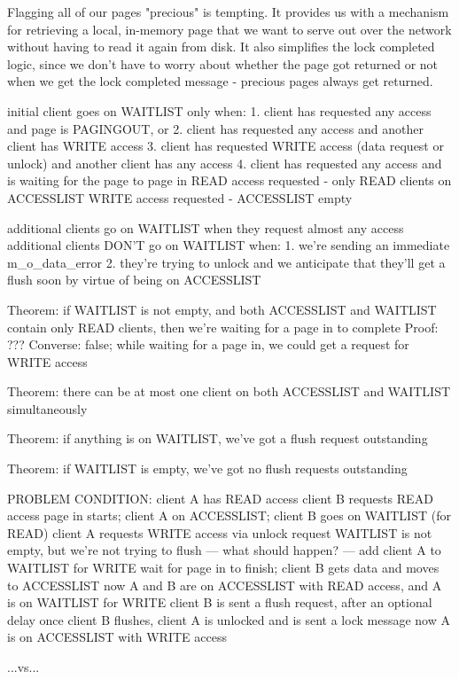 \documentclass{article}
\begin{document}
Flagging all of our pages "precious" is tempting.  It provides us with a mechanism
for retrieving a local, in-memory page that we want to serve out over the network
without having to read it again from disk.  It also simplifies the lock completed
logic, since we don't have to worry about whether the page got returned or not
when we get the lock completed message - precious pages always get returned.


initial client goes on WAITLIST only when:
1. client has requested any access and page is PAGINGOUT, or
2. client has requested any access and another client has WRITE access
3. client has requested WRITE access (data request or unlock) and another client has any access
4. client has requested any access and is waiting for the page to page in
     READ access requested - only READ clients on ACCESSLIST
     WRITE access requested - ACCESSLIST empty

additional clients go on WAITLIST when they request almost any access
additional clients DON'T go on WAITLIST when:
1. we're sending an immediate m_o_data_error
2. they're trying to unlock and we anticipate that they'll get a flush soon by virtue of being on ACCESSLIST

Theorem: if WAITLIST is not empty, and both ACCESSLIST and WAITLIST contain only READ clients,
         then we're waiting for a page in to complete
Proof: ???
Converse: false; while waiting for a page in, we could get a request for WRITE access

Theorem: there can be at most one client on both ACCESSLIST and WAITLIST simultaneously

Theorem: if anything is on WAITLIST, we've got a flush request outstanding

Theorem: if WAITLIST is empty, we've got no flush requests outstanding

PROBLEM CONDITION:
client A has READ access
client B requests READ access
page in starts; client A on ACCESSLIST; client B goes on WAITLIST (for READ)
client A requests WRITE access via unlock request
WAITLIST is not empty, but we're not trying to flush
--- what should happen? ---
add client A to WAITLIST for WRITE
wait for page in to finish; client B gets data and moves to ACCESSLIST
now A and B are on ACCESSLIST with READ access, and A is on WAITLIST for WRITE
client B is sent a flush request, after an optional delay
once client B flushes, client A is unlocked and is sent a lock message
now A is on ACCESSLIST with WRITE access

...vs...
\end{document}
